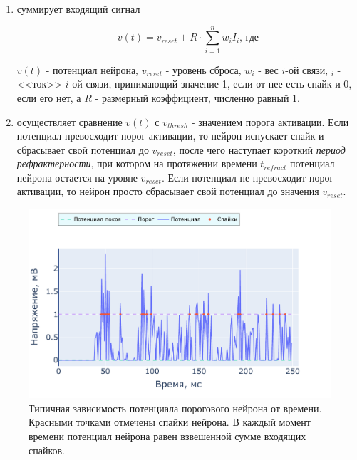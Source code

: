 \documentclass[a4paper]{article}
\begin{document}
\begin{enumerate}
 \item суммирует входящий сигнал

\begin{equation} \label{eq:thresh}
v(t) = v_{reset} + R \cdot \sum_{i=1}^n {w_i I_i} \text{, где}
\end{equation}

$v(t)$ - потенциал нейрона, $v_{reset}$ - уровень сброса, $w_i$ - вес $i$-ой связи, $_i$ - <<ток>> $i$-ой связи, принимающий значение 1, если от нее есть спайк и 0, если его нет, а $R$ - размерный коэффициент, численно равный 1.

\item осуществляет сравнение $v(t)$ с $v_{thresh}$ - значением порога активации. Если потенциал превосходит порог активации, то нейрон испускает спайк и сбрасывает свой потенциал до $v_{reset}$, после чего наступает короткий \textit{период рефрактерности}, при котором на протяжении времени $t_{refract}$ потенциал нейрона остается на уровне $v_{reset}$. Если потенциал не превосходит порог активации, то нейрон просто сбрасывает свой потенциал до значения $v_{reset}$.
\end{enumerate}

\begin{center}
\begin{figure}[H] 
 \includegraphics[width=\textwidth,keepaspectratio=true]{model_thresh_ru.pdf}
 \caption{Типичная зависимость потенциала порогового нейрона от времени. Красными точками отмечены спайки нейрона. В каждый момент времени потенциал нейрона равен взвешенной сумме входящих спайков.}
\end{figure}
\end{center}
\end{document}
